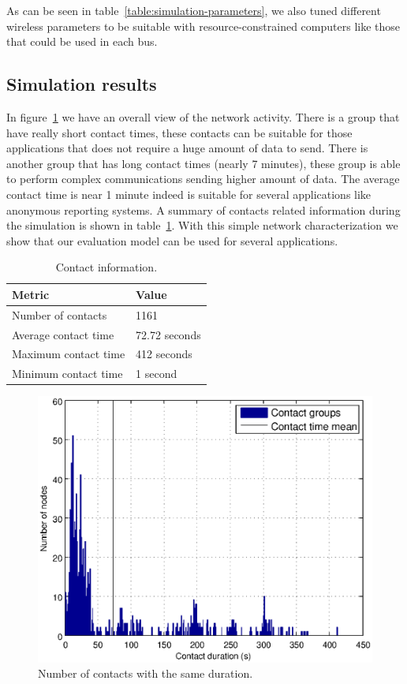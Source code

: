As can be seen in table~\ref{table:simulation-parameters}, we also tuned different wireless parameters to be suitable with resource-constrained computers like those that could be used in each bus.

\subsection{Simulation results}


In figure~\ref{fig:contact-duration-group} we have an overall view of the network activity. There is a group that have really short contact times, these contacts can be suitable for those applications that does not require a huge amount of data to send. There is another group that has long contact times (nearly 7 minutes), these group is able to perform complex communications sending higher amount of data. The average contact time is near 1 minute indeed is suitable for several applications like anonymous reporting systems. A summary of contacts related information during the simulation is shown in table~\ref{table:contact-information}. With this simple network characterization we show that our evaluation model can be used for several applications. 

\begin{table}[h]
\centering
\begin{tabular}{l|l}
Metric & Value \\
\hline
Number of contacts & 1161 \\
Average contact time  & 72.72 seconds \\
Maximum contact time &  412 seconds\\
Minimum contact time &  1 second
\end{tabular}
\caption{Contact information.}
\label{table:contact-information}
\end{table}

\begin{figure}[hbt]
  \centering
  \includegraphics[scale=0.70]{imgs/statistics/contats-duration}
  \caption{Number of contacts with the same duration.}
  \label{fig:contact-duration-group}
\end{figure}


